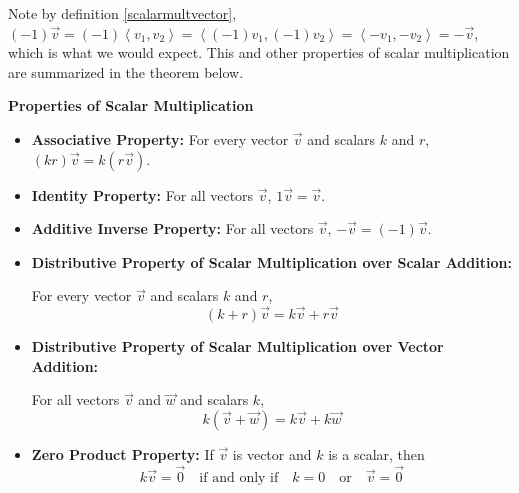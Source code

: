 \documentclass{ximera}
\begin{document}
Note  by definition \ref{scalarmultvector}, $(-1)\overrightarrow{v} = (-1)\left<v_1,v_2\right> = \left<(-1)v_1, (-1)v_2\right> = \left<-v_1,-v_2\right> = -\overrightarrow{v}$, which is what we would expect.   This and other properties of scalar multiplication are summarized in the theorem below. 

 
\begin{theorem}  \label{vectorscalarmultprops}\textbf{Properties of Scalar Multiplication}  

\begin{itemize}

\item  \textbf{Associative Property:}    For every  vector $\overrightarrow{v}$ and scalars  $k$ and $r$, $(kr)\overrightarrow{v} = k(r\overrightarrow{v})$.

\item  \textbf{Identity Property:}   For all vectors $\overrightarrow{v}$, $1\overrightarrow{v} = \overrightarrow{v}$.

\item  \textbf{Additive Inverse Property:} For all vectors $\overrightarrow{v}$, $-\overrightarrow{v} = (-1)\overrightarrow{v}$. 

\item  \textbf{Distributive Property of Scalar Multiplication over Scalar Addition:}    

For every  vector $\overrightarrow{v}$ and scalars  $k$ and $r$, \[(k+r)\overrightarrow{v} = k\overrightarrow{v} + r\overrightarrow{v}\]

\item  \textbf{Distributive Property of Scalar Multiplication over Vector Addition:} 

For all vectors $\overrightarrow{v}$ and $\overrightarrow{w}$ and scalars $k$, \[k(\overrightarrow{v}+\overrightarrow{w}) = k\overrightarrow{v} + k\overrightarrow{w}\] 

\item  \textbf{Zero Product Property:}   If $\overrightarrow{v}$ is vector and $k$ is a scalar, then 
\[k\overrightarrow{v} = \overrightarrow{0} \quad \text{if and only if} \quad k=0 \quad \text{or} \quad \overrightarrow{v} =\overrightarrow{0}\]


\end{itemize}

\end{theorem}
 
\end{document}
